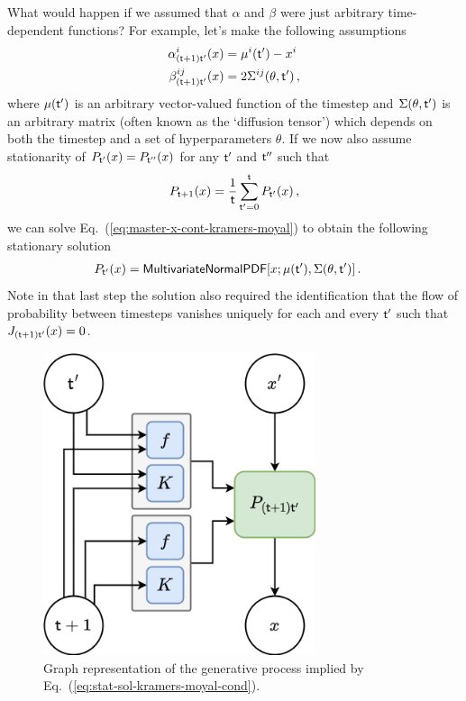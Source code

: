 What would happen if we assumed that $\alpha$ and $\beta$ were just arbitrary time-dependent functions? For example, let's make the following assumptions
\begin{align}
\alpha^i_{({\sf t}+1){\sf t}'}(x) &= \mu^i({\sf t}')-x^i \\
\beta^{ij}_{({\sf t}+1){\sf t}'}(x) &= 2\Sigma^{ij}(\theta, {\sf t}') \,,
\end{align}
where $\mu ({\sf t}')$ is an arbitrary vector-valued function of the timestep and $\Sigma (\theta ,{\sf t}')$ is an arbitrary matrix (often known as the `diffusion tensor') which depends on both the timestep and a set of hyperparameters $\theta$. If we now also assume stationarity of $P_{{\sf t}'}(x)=P_{{\sf t}''}(x)$ for any ${\sf t}'$ and ${\sf t}''$ such that
\begin{align}
P_{{\sf t}+1}(x) = \frac{1}{{\sf t}}\sum_{{\sf t}'=0}^{{\sf t}} P_{{\sf t}'}(x) \,,
\end{align}
we can solve Eq.~(\ref{eq:master-x-cont-kramers-moyal}) to obtain the following stationary solution
\begin{align}
P_{{\sf t}'}(x) &= {\sf MultivariateNormalPDF}[x;\mu ({\sf t}'),\Sigma (\theta , {\sf t}')]\label{eq:stat-sol-kramers-moyal}\,.
\end{align}
Note in that last step the solution also required the identification that the flow of probability between timesteps vanishes uniquely for each and every ${\sf t}'$ such that $J_{({\sf t}+1){\sf t}'}(x)=0$. 

\begin{figure}[h]
\centering
\includegraphics[width=8cm]{images/gp-like-diag.drawio.png}
\caption{Graph representation of the generative process implied by Eq.~(\ref{eq:stat-sol-kramers-moyal-cond}).}
\label{fig:stat-sol-kramers-moyal-cond}
\end{figure}

